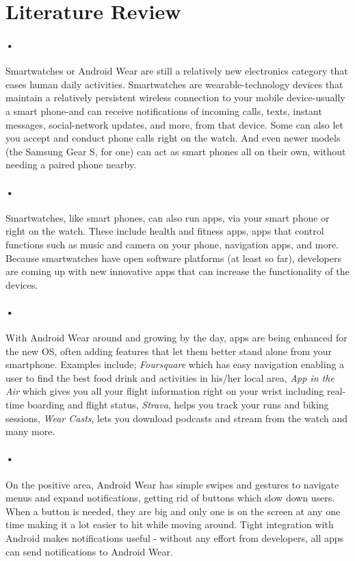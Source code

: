 \documentclass[7pt]{article}
\begin{document}
\section*{Literature Review}
\paragraph{•}
Smartwatches or Android Wear are still a relatively new electronics category that eases human daily activities. Smartwatches are 
wearable-technology devices that maintain a relatively persistent wireless connection to your mobile device-usually a smart phone-and can receive notifications of incoming 
calls, texts, instant messages, social-network updates, and more, from that device. Some can also let you accept and conduct phone 
calls right on the watch. And even newer models (the Samsung Gear S, for one) can act as smart phones all on their own, without needing 
a paired phone nearby.
\paragraph{•}
Smartwatches, like smart phones, can also run apps, via your smart phone or right on the watch. These include health and fitness apps, 
apps that control functions such as music and camera on your phone, navigation apps, and more. 
Because smartwatches have open software platforms (at least so far), developers are coming up with new innovative apps that can increase 
the functionality of the devices. \cite{mangis}

\paragraph{•}
With Android Wear around and growing by the day, apps are being enhanced for the new OS, often adding features
that let them better stand alone from your smartphone. Examples include; \textit{Foursquare} which has easy navigation enabling
 a user to find the best food drink and activities in his/her local area, \textit{App in the Air} which gives you all your flight
  information right on your wrist including real-time boarding and flight status, \textit{Strava}, helps you track your runs and biking sessions,
  \textit{Wear Casts}, lets you download podcasts and stream from the watch and many more. \cite{nield}

\paragraph{•}
On the positive area, Android Wear has simple swipes and gestures to navigate menus and expand 
notifications, getting rid of buttons which slow down users. When a button is needed, they are big and only one is on the screen
at any one time making it a lot easier to hit while moving around. Tight integration with Android makes notifications useful - without any effort from developers, all apps can send notifications to Android Wear.
\end{document}
